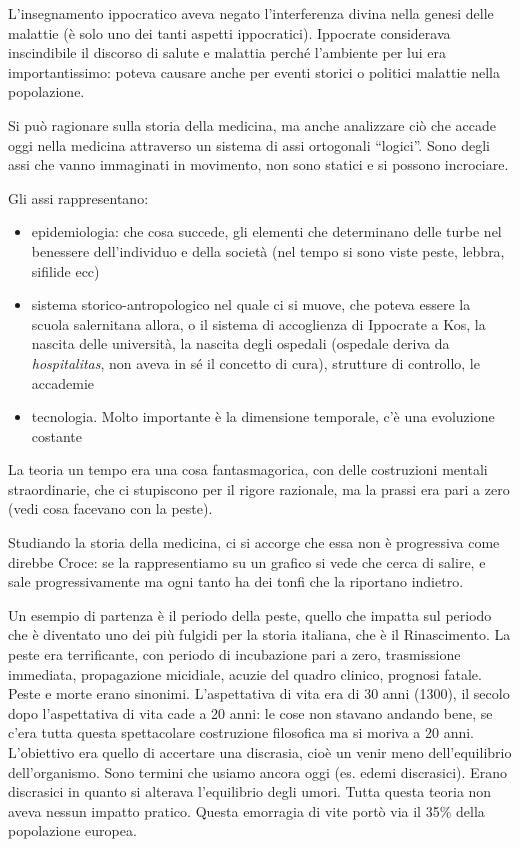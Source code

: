 L'insegnamento ippocratico aveva negato l'interferenza divina nella
genesi delle malattie (è solo uno dei tanti aspetti ippocratici).
Ippocrate considerava inscindibile il discorso di salute e malattia
perché l'ambiente per lui era importantissimo: poteva causare anche per
eventi storici o politici malattie nella popolazione.

Si può ragionare sulla storia della medicina, ma anche analizzare ciò
che accade oggi nella medicina attraverso un sistema di assi ortogonali
``logici''. Sono degli assi che vanno immaginati in movimento, non sono
statici e si possono incrociare.

Gli assi rappresentano:
\begin{itemize}
\item epidemiologia: che cosa succede, gli elementi che determinano delle
turbe nel benessere dell'individuo e della società (nel tempo si sono
viste peste, lebbra, sifilide ecc)
\item sistema storico-antropologico nel quale ci si muove, che poteva essere
la scuola salernitana allora, o il sistema di accoglienza di Ippocrate a
Kos, la nascita delle università, la nascita degli ospedali (ospedale
deriva da \emph{hospitalitas}, non aveva in sé il concetto di cura),
strutture di controllo, le accademie
\item tecnologia. Molto importante è la dimensione temporale, c'è una
evoluzione costante
\end{itemize}

La teoria un tempo era una cosa fantasmagorica, con delle costruzioni
mentali straordinarie, che ci stupiscono per il rigore razionale, ma la
prassi era pari a zero (vedi cosa facevano con la peste).

Studiando la storia della medicina, ci si accorge che essa non è
progressiva come direbbe Croce: se la rappresentiamo su un grafico si
vede che cerca di salire, e sale progressivamente ma ogni tanto ha dei
tonfi che la riportano indietro.

Un esempio di partenza è il periodo della peste, quello che impatta sul
periodo che è diventato uno dei più fulgidi per la storia italiana, che
è il Rinascimento. La peste era terrificante, con periodo di incubazione
pari a zero, trasmissione immediata, propagazione micidiale, acuzie del
quadro clinico, prognosi fatale. Peste e morte erano sinonimi.
L'aspettativa di vita era di 30 anni (1300), il secolo dopo
l'aspettativa di vita cade a 20 anni: le cose non stavano andando bene,
se c'era tutta questa spettacolare costruzione filosofica ma si moriva a
20 anni. L'obiettivo era quello di accertare una discrasia, cioè un
venir meno dell'equilibrio dell'organismo. Sono termini che usiamo
ancora oggi (es. edemi discrasici). Erano discrasici in quanto si
alterava l'equilibrio degli umori. Tutta questa teoria non aveva nessun
impatto pratico. Questa emorragia di vite portò via il 35\% della
popolazione europea.

